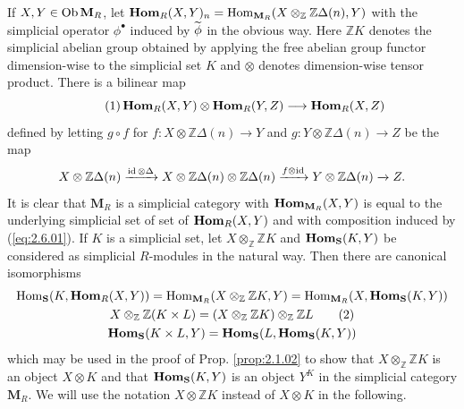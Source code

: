 \documentclass[../main]{subfiles}
\begin{document}
If $X,Y\in\operatorname{Ob}\mathbf{M}_R$, let $\operatorname{\mathbf{Hom}}_R(X,Y)_n=\operatorname{Hom}_{\mathbf{M}_R}(X\otimes_{\mathbb{Z}}\mathbb{Z}\Delta(n),Y)$ with the simplicial operator $\phi^\bullet $ induced by $\xtilde{\phi}$ in the obvious way. Here $\mathbb{Z}K$ denotes the simplicial abelian group obtained by applying the free abelian group functor dimension-wise to the simplicial set $K$ and $\otimes$ denotes dimension-wise tensor product. There is a bilinear map
\begin{equation}\tag{1}\label{eq:2.6.01}
    \operatorname{\mathbf{Hom}}_{R}(X,Y)\otimes\operatorname{\mathbf{Hom}}_R(Y,Z)\longrightarrow\operatorname{\mathbf{Hom}}_R(X,Z)
\end{equation}
defined by letting $g\circ f$ for $f:X\otimes\mathbb{Z}\Delta(n)\longrightarrow Y$ and $g:Y\otimes\mathbb{Z}\Delta(n)\longrightarrow Z$ be the map
\begin{equation*}  
X\otimes\mathbb{Z}\Delta(n)\xrightarrow{\operatorname{id} \otimes\Delta}X\otimes\mathbb{Z}\Delta(n)\otimes\mathbb{Z}\Delta(n)\xrightarrow{f\otimes\operatorname{id} }Y\otimes\mathbb{Z}\Delta(n)\xrightarrow[]{}Z.
\end{equation*}
It is clear that $\mathbf{M}_R$ is a simplicial category with $\operatorname{\mathbf{Hom}}_{\mathbf{M}_R}(X,Y)$ %
is equal to the underlying simplicial set of set of $\operatorname{\mathbf{Hom}}_R(X,Y)$ and with composition induced by (\ref{eq:2.6.01}). If $K$ is a simplicial set, let $X\otimes_{\mathbb{Z}}\mathbb{Z}K$ and $\operatorname{\mathbf{Hom}}_{\mathbf{S}}(K,Y)$ be considered as simplicial $R$-modules in the natural way. Then there are canonical isomorphisms
\begin{gather*}
\operatorname{Hom}_{\mathbf{S}}(K,\operatorname{\mathbf{Hom}}_R(X,Y))=\operatorname{Hom}_{\mathbf{M}_R}(X\otimes_{\mathbb{Z}}\mathbb{Z}K,Y)=\operatorname{Hom}_{\mathbf{M}_R}(X,\operatorname{\mathbf{Hom}}_{\mathbf{S}}(K,Y))\nonumber\\
X\otimes_{\mathbb{Z}}\mathbb{Z}(K\times L)=(X\otimes_{\mathbb{Z}}\mathbb{Z}K)\otimes_{\mathbb{Z}}\mathbb{Z}L\label{eq:2.6.02}\tag{2}\\
\operatorname{\mathbf{Hom}}_{\mathbf{S}}(K\times L,Y)=\operatorname{\mathbf{Hom}}_{\mathbf{S}}(L,\operatorname{\mathbf{Hom}}_{\mathbf{S}}(K,Y))\nonumber
\end{gather*}
which may be used in the proof of Prop. \ref{prop:2.1.02} to show that $X\otimes_{\mathbb{Z}}\mathbb{Z}K$ is an object $X\otimes K$ and that $\operatorname{\mathbf{Hom}}_{\mathbf{S}}(K,Y)$ is an object $Y^K$ in the simplicial category $\mathbf{M}_R$. We will use the notation $X\otimes\mathbb{Z}K$ instead of $X\otimes K$ in the following.
\end{document}
